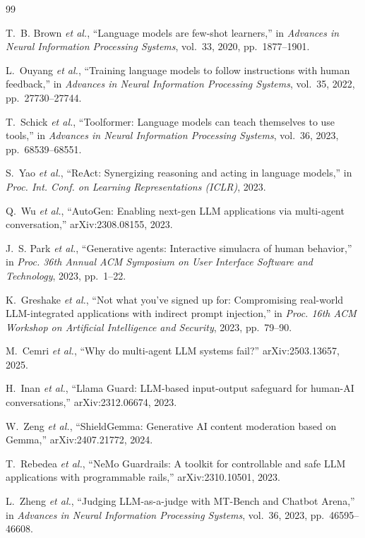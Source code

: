 \documentclass[conference]{IEEEtran}
\begin{document}
\begin{thebibliography}{99}



 T.~B. Brown \emph{et al.}, ``Language models are few-shot learners,'' in \emph{Advances in Neural Information Processing Systems}, vol.~33, 2020, pp.~1877--1901.

 L.~Ouyang \emph{et al.}, ``Training language models to follow instructions with human feedback,'' in \emph{Advances in Neural Information Processing Systems}, vol.~35, 2022, pp.~27730--27744.

 T.~Schick \emph{et al.}, ``Toolformer: Language models can teach themselves to use tools,'' in \emph{Advances in Neural Information Processing Systems}, vol.~36, 2023, pp.~68539--68551.

 S.~Yao \emph{et al.}, ``ReAct: Synergizing reasoning and acting in language models,'' in \emph{Proc. Int. Conf. on Learning Representations (ICLR)}, 2023.

 Q.~Wu \emph{et al.}, ``AutoGen: Enabling next-gen LLM applications via multi-agent conversation,'' arXiv:2308.08155, 2023.

 J.~S. Park \emph{et al.}, ``Generative agents: Interactive simulacra of human behavior,'' in \emph{Proc. 36th Annual ACM Symposium on User Interface Software and Technology}, 2023, pp.~1--22.

 K.~Greshake \emph{et al.}, ``Not what you've signed up for: Compromising real-world LLM-integrated applications with indirect prompt injection,'' in \emph{Proc. 16th ACM Workshop on Artificial Intelligence and Security}, 2023, pp.~79--90.

 M.~Cemri \emph{et al.}, ``Why do multi-agent LLM systems fail?'' arXiv:2503.13657, 2025.

 H.~Inan \emph{et al.}, ``Llama Guard: LLM-based input-output safeguard for human-AI conversations,'' arXiv:2312.06674, 2023.

 W.~Zeng \emph{et al.}, ``ShieldGemma: Generative AI content moderation based on Gemma,'' arXiv:2407.21772, 2024.

 T.~Rebedea \emph{et al.}, ``NeMo Guardrails: A toolkit for controllable and safe LLM applications with programmable rails,'' arXiv:2310.10501, 2023.

 L.~Zheng \emph{et al.}, ``Judging LLM-as-a-judge with MT-Bench and Chatbot Arena,'' in \emph{Advances in Neural Information Processing Systems}, vol.~36, 2023, pp.~46595--46608.


\end{thebibliography}
\end{document}
